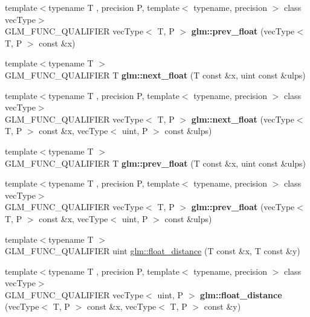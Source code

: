 \begin{DoxyCompactItemize}
\item 
{\footnotesize template$<$typename T , precision P, template$<$ typename, precision $>$ class vec\+Type$>$ }\\G\+L\+M\+\_\+\+F\+U\+N\+C\+\_\+\+Q\+U\+A\+L\+I\+F\+I\+ER vec\+Type$<$ T, P $>$ {\bfseries glm\+::prev\+\_\+float} (vec\+Type$<$ T, P $>$ const \&x)\hypertarget{namespaceglm_a90916626e6b0ed925938226f31b38c6b}{}\label{namespaceglm_a90916626e6b0ed925938226f31b38c6b}

\item 
{\footnotesize template$<$typename T $>$ }\\G\+L\+M\+\_\+\+F\+U\+N\+C\+\_\+\+Q\+U\+A\+L\+I\+F\+I\+ER T {\bfseries glm\+::next\+\_\+float} (T const \&x, uint const \&ulps)\hypertarget{namespaceglm_ae4ffae05b7502be722f522c04f7e42ac}{}\label{namespaceglm_ae4ffae05b7502be722f522c04f7e42ac}

\item 
{\footnotesize template$<$typename T , precision P, template$<$ typename, precision $>$ class vec\+Type$>$ }\\G\+L\+M\+\_\+\+F\+U\+N\+C\+\_\+\+Q\+U\+A\+L\+I\+F\+I\+ER vec\+Type$<$ T, P $>$ {\bfseries glm\+::next\+\_\+float} (vec\+Type$<$ T, P $>$ const \&x, vec\+Type$<$ uint, P $>$ const \&ulps)\hypertarget{namespaceglm_a3ad10c60be0fa0e754c8064ca13c4b91}{}\label{namespaceglm_a3ad10c60be0fa0e754c8064ca13c4b91}

\item 
{\footnotesize template$<$typename T $>$ }\\G\+L\+M\+\_\+\+F\+U\+N\+C\+\_\+\+Q\+U\+A\+L\+I\+F\+I\+ER T {\bfseries glm\+::prev\+\_\+float} (T const \&x, uint const \&ulps)\hypertarget{namespaceglm_a87ac8f75510274e112fe8512cfaa6935}{}\label{namespaceglm_a87ac8f75510274e112fe8512cfaa6935}

\item 
{\footnotesize template$<$typename T , precision P, template$<$ typename, precision $>$ class vec\+Type$>$ }\\G\+L\+M\+\_\+\+F\+U\+N\+C\+\_\+\+Q\+U\+A\+L\+I\+F\+I\+ER vec\+Type$<$ T, P $>$ {\bfseries glm\+::prev\+\_\+float} (vec\+Type$<$ T, P $>$ const \&x, vec\+Type$<$ uint, P $>$ const \&ulps)\hypertarget{namespaceglm_a742d4d85c23906178d1fd0c9fbab266c}{}\label{namespaceglm_a742d4d85c23906178d1fd0c9fbab266c}

\item 
{\footnotesize template$<$typename T $>$ }\\G\+L\+M\+\_\+\+F\+U\+N\+C\+\_\+\+Q\+U\+A\+L\+I\+F\+I\+ER uint \hyperlink{group__gtc__ulp_ga2e09bd6c8b0a9c91f6f5683d68245634}{glm\+::float\+\_\+distance} (T const \&x, T const \&y)
\item 
{\footnotesize template$<$typename T , precision P, template$<$ typename, precision $>$ class vec\+Type$>$ }\\G\+L\+M\+\_\+\+F\+U\+N\+C\+\_\+\+Q\+U\+A\+L\+I\+F\+I\+ER vec\+Type$<$ uint, P $>$ {\bfseries glm\+::float\+\_\+distance} (vec\+Type$<$ T, P $>$ const \&x, vec\+Type$<$ T, P $>$ const \&y)\hypertarget{namespaceglm_a2e00104097b2f3967e97131933595309}{}\label{namespaceglm_a2e00104097b2f3967e97131933595309}

\end{DoxyCompactItemize}
